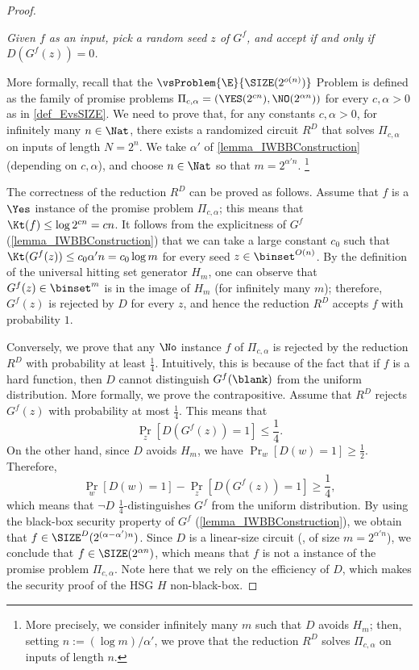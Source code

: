 \documentclass{toc}
\begin{document}
\begin{proof}
\begin{description}
          \emph{
            Given $f$ as an input,
            pick a random seed $z$ of $G^f$, and accept if and only if $D(G^f(z)) = 0$.
          }
  \end{description}
  More formally,
  recall that the $\vsProblem{\E}{\SIZE(2^{o(n)})}$ Problem is defined as
  the family of promise problems $\Pi_{c, \alpha} = (\YES(2^{c n}), \NO(2^{\alpha n}))$ for every $c, \alpha > 0$
  as in \cref{def_EvsSIZE}.
  We need to prove that, for any constants $c, \alpha > 0$,
  for infinitely many $n \in \Nat$,
  there exists a randomized circuit $R^D$ that solves $\Pi_{c, \alpha}$
  on inputs of length $N = 2^n$.
  We take $\alpha'$ of \cref{lemma_IWBBConstruction} (depending on $c, \alpha$), and
  choose $n \in \Nat$
  so that
  $m = 2^{\alpha' n}$.%
  \footnote{More precisely, we consider infinitely many $m$ such that $D$ avoids $H_m$;
    then, setting $n := (\log m) / \alpha'$, we prove that the reduction $R^D$ solves
    $\Pi_{c, \alpha}$ on inputs of length $n$.}

  The correctness of the reduction $R^D$ can be proved as follows.
  Assume that $f$ is a $\Yes$ instance of the promise problem $\Pi_{c, \alpha}$;
  this means that $\Kt(f) \le \log 2^{c n} = c n$.
  It follows from the explicitness of $G^f$ (\cref{lemma_IWBBConstruction})
  that
  we can take a large constant $c_0$ such that
  $\Kt(G^f(z)) \le c_0 \alpha' n = c_0 \log m$ for every seed $z \in \binset^{O(n)}$.
  By the definition of the universal hitting set generator $H_m$,
  one can observe that $G^f(z) \in \binset^m$ is in the image of $H_m$
  (for infinitely many $m$);
  therefore, $G^f(z)$ is rejected by $D$
  for every $z$,
  and hence the reduction $R^D$ accepts $f$ with probability $1$.

  Conversely,
  we prove that any $\No$ instance $f$ of $\Pi_{c, \alpha}$
  is rejected by the reduction $R^D$ with probability at least $\frac{1}{4}$.
  Intuitively, this is because of the fact that if $f$ is a hard function, then
  $D$ cannot distinguish $G^f(\blank)$
  from the uniform distribution.
  More formally, we prove the contrapositive.
  Assume that $R^D$ rejects $G^f(z)$ with probability at most $\frac{1}{4}$.
  This means that
  $$
    \Pr_z[ D(G^f(z)) = 1 ] \le \frac{1}{4}.
  $$
  On the other hand, since $D$ avoids $H_m$, we have $\Pr_w [ D(w) = 1 ] \ge \frac{1}{2}$.
  Therefore,
  $$
    \Pr_w [D(w) = 1] - \Pr_z[ D(G^f(z)) = 1 ] \ge \frac{1}{4},
  $$
  which means that
  $\neg D$ $\frac{1}{4}$-distinguishes $G^f$ from the uniform distribution.
  By using the black-box security property of $G^f$ (\cref{lemma_IWBBConstruction}),
  we obtain that $f \in \SIZE^D(2^{(\alpha - \alpha') n})$.
  Since $D$ is a linear-size circuit (\ie, of size $m = 2^{\alpha' n}$), we conclude that $f \in \SIZE(2^{\alpha n})$,
  which means that $f$ is not a \No instance of the promise problem $\Pi_{c, \alpha}$.
  Note here that we rely on the efficiency of $D$, which makes the security proof of the HSG $H$ non-black-box.



\end{proof}
\end{document}
